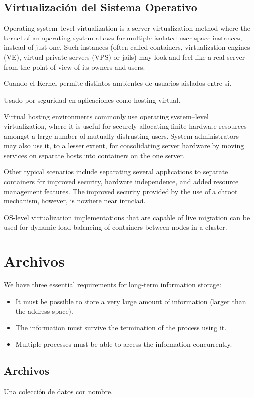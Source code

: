\documentclass[a4paper, twoside]{article}
\begin{document}
\subsection{Virtualización del Sistema Operativo}
Operating system–level virtualization is a server virtualization method where the kernel of an operating system allows for multiple isolated user space instances, instead of just one. Such instances (often called containers, virtualization engines (VE), virtual private servers (VPS) or jails) may look and feel like a real server from the point of view of its owners and users.

Cuando el Kernel permite distintos ambientes de usuarios aislados entre sí.

Usado por seguridad en aplicaciones como hosting virtual.

Virtual hosting environments commonly use operating system–level virtualization, where it is useful for securely allocating finite hardware resources amongst a large number of mutually-distrusting users. System administrators may also use it, to a lesser extent, for consolidating server hardware by moving services on separate hosts into containers on the one server.

Other typical scenarios include separating several applications to separate containers for improved security, hardware independence, and added resource management features. The improved security provided by the use of a chroot mechanism, however, is nowhere near ironclad.

OS-level virtualization implementations that are capable of live migration can be used for dynamic load balancing of containers between nodes in a cluster.

\newpage
\section{Archivos}
We have three essential requirements for long-term information storage:
\begin{itemize}
	\item It must be possible to store a very large amount of information (larger than the address space).
	\item The information must survive the termination of the process using it.
	\item Multiple processes must be able to access the information concurrently.
\end{itemize}

\subsection{Archivos}
Una colección de datos con nombre.
\end{document}
